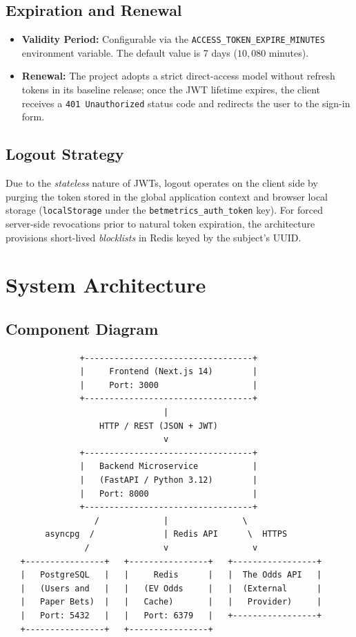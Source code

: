 \documentclass[11pt,a4paper]{article}
\begin{document}
\subsection{Expiration and Renewal}
\begin{itemize}
    \item \textbf{Validity Period:} Configurable via the \texttt{ACCESS\_TOKEN\_EXPIRE\_MINUTES} environment variable. The default value is 7 days ($10{,}080$ minutes).
    \item \textbf{Renewal:} The project adopts a strict direct-access model without refresh tokens in its baseline release; once the JWT lifetime expires, the client receives a \texttt{401 Unauthorized} status code and redirects the user to the sign-in form.
\end{itemize}

\subsection{Logout Strategy}
Due to the \textit{stateless} nature of JWTs, logout operates on the client side by purging the token stored in the global application context and browser local storage (\texttt{localStorage} under the \texttt{betmetrics\_auth\_token} key). For forced server-side revocations prior to natural token expiration, the architecture provisions short-lived \textit{blocklists} in Redis keyed by the subject's UUID.

\section{System Architecture}

\subsection{Component Diagram}

\begin{lstlisting}
               +----------------------------------+
               |     Frontend (Next.js 14)        |
               |     Port: 3000                   |
               +----------------------------------+
                                |
                   HTTP / REST (JSON + JWT)
                                v
               +----------------------------------+
               |   Backend Microservice           |
               |   (FastAPI / Python 3.12)        |
               |   Port: 8000                     |
               +----------------------------------+
                  /             |               \
        asyncpg  /              | Redis API      \  HTTPS
                /               v                 v
   +----------------+   +----------------+   +-----------------+
   |   PostgreSQL   |   |     Redis      |   |  The Odds API   |
   |   (Users and   |   |   (EV Odds     |   |  (External      |
   |   Paper Bets)  |   |   Cache)       |   |   Provider)     |
   |   Port: 5432   |   |   Port: 6379   |   +-----------------+
   +----------------+   +----------------+
\end{lstlisting}
\end{document}
